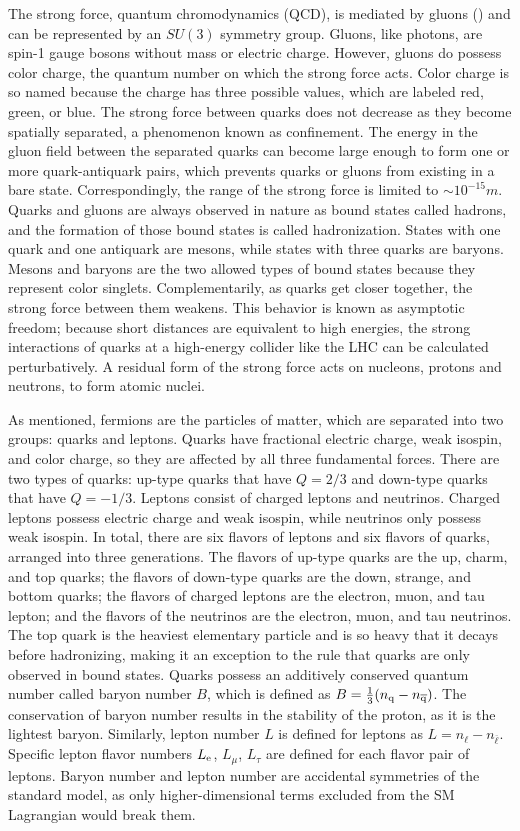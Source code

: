 \documentclass[12pt]{thesis}  %
\newcommand{\Pe}{\ensuremath{\cmsSymbolFace{e}}\xspace}
\begin{document}
The strong force, quantum chromodynamics (QCD), is mediated by gluons (\cPg) and can be represented by an $SU(3)$ symmetry group. Gluons, like photons, are spin-1 gauge bosons without mass or electric charge. However, gluons do possess color charge, the quantum number on which the strong force acts. Color charge is so named because the charge has three possible values, which are labeled red, green, or blue. The strong force between quarks does not decrease as they become spatially separated, a phenomenon known as confinement. The energy in the gluon field between the separated quarks can become large enough to form one or more quark-antiquark pairs, which prevents quarks or gluons from existing in a bare state. Correspondingly, the range of the strong force is limited to ${\sim} 10^{-15}\unit{m}$. Quarks and gluons are always observed in nature as bound states called hadrons, and the formation of those bound states is called hadronization. States with one quark and one antiquark are mesons, while states with three quarks are baryons. Mesons and baryons are the two allowed types of bound states because they represent color singlets. Complementarily, as quarks get closer together, the strong force between them weakens. This behavior is known as asymptotic freedom; because short distances are equivalent to high energies, the strong interactions of quarks at a high-energy collider like the LHC can be calculated perturbatively. A residual form of the strong force acts on nucleons, protons and neutrons, to form atomic nuclei.

As mentioned, fermions are the particles of matter, which are separated into two groups: quarks and leptons. Quarks have fractional electric charge, weak isospin, and color charge, so they are affected by all three fundamental forces. There are two types of quarks: up-type quarks that have $Q = 2/3$ and down-type quarks that have $Q = -1/3$. Leptons consist of charged leptons and neutrinos. Charged leptons possess electric charge and weak isospin, while neutrinos only possess weak isospin. In total, there are six flavors of leptons and six flavors of quarks, arranged into three generations. The flavors of up-type quarks are the up, charm, and top quarks; the flavors of down-type quarks are the down, strange, and bottom quarks; the flavors of charged leptons are the electron, muon, and tau lepton; and the flavors of the neutrinos are the electron, muon, and tau neutrinos. The top quark is the heaviest elementary particle and is so heavy that it decays before hadronizing, making it an exception to the rule that quarks are only observed in bound states. Quarks possess an additively conserved quantum number called baryon number $B$, which is defined as $B = \frac{1}{3}(n_{\mathrm{q}} - n_{\overline{\mathrm{q}}})$. The conservation of baryon number results in the stability of the proton, as it is the lightest baryon. Similarly, lepton number $L$ is defined for leptons as $L = n_{\ell} - n_{\overline{\ell}}$. Specific lepton flavor numbers $L_{\Pe}$, $L_{\mu}$, $L_{\tau}$ are defined for each flavor pair of leptons. Baryon number and lepton number are accidental symmetries of the standard model, as only higher-dimensional terms excluded from the SM Lagrangian would break them. 
\end{document}

